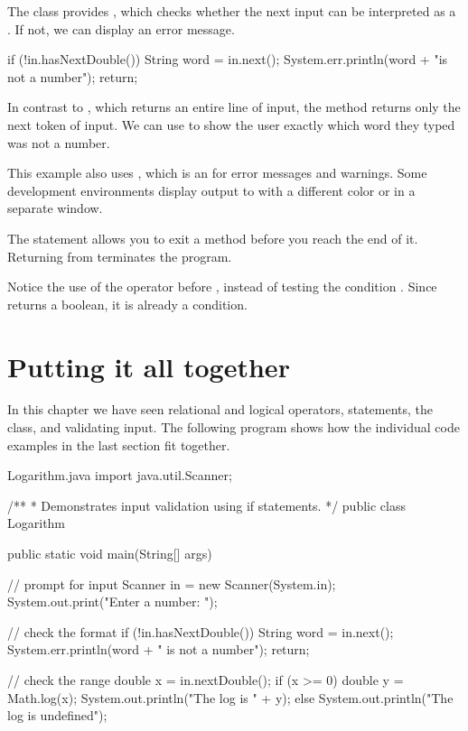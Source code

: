 The  class provides , which checks whether the next input can be interpreted as a .
If not, we can display an error message.

\begin{code}
if (!in.hasNextDouble()) {
    String word = in.next();
    System.err.println(word + "is not a number");
    return;
}
\end{code}


In contrast to , which returns an entire line of input, the  method returns only the next token of input.
We can use  to show the user exactly which word they typed was not a number.


This example also uses , which is an  for error messages and warnings.
Some development environments display output to  with a different color or in a separate window.


The  statement allows you to exit a method before you reach the end of it.
Returning from  terminates the program.

Notice the use of the \java{!} operator before , instead of testing the condition .
Since  returns a boolean, it is already a condition.

\section{Putting it all together}

In this chapter we have seen relational and logical operators,  statements, the  class, and validating input.
The following program shows how the individual code examples in the last section fit together.

\begin{trinket}{Logarithm.java}
import java.util.Scanner;

/**
 * Demonstrates input validation using if statements.
 */
public class Logarithm {

    public static void main(String[] args) {

        // prompt for input
        Scanner in = new Scanner(System.in);
        System.out.print("Enter a number: ");

        // check the format
        if (!in.hasNextDouble()) {
            String word = in.next();
            System.err.println(word + " is not a number");
            return;
        }

        // check the range
        double x = in.nextDouble();
        if (x >= 0) {
            double y = Math.log(x);
            System.out.println("The log is " + y);
        } else {
            System.out.println("The log is undefined");
        }
    }
}
\end{trinket}

